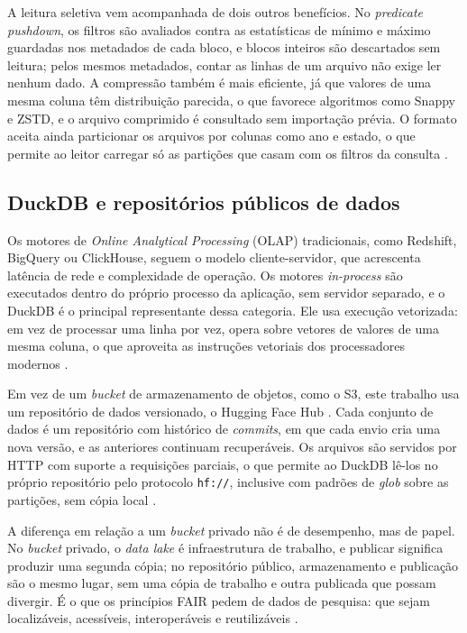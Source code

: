 A leitura seletiva vem acompanhada de dois outros benefícios. No \textit{predicate pushdown}, os filtros são avaliados contra as estatísticas de mínimo e máximo guardadas nos metadados de cada bloco, e blocos inteiros são descartados sem leitura; pelos mesmos metadados, contar as linhas de um arquivo não exige ler nenhum dado. A compressão também é mais eficiente, já que valores de uma mesma coluna têm distribuição parecida, o que favorece algoritmos como Snappy e ZSTD, e o arquivo comprimido é consultado sem importação prévia. O formato aceita ainda particionar os arquivos por colunas como ano e estado, o que permite ao leitor carregar só as partições que casam com os filtros da consulta \cite{ApacheParquet2024}.

\subsection{DuckDB e repositórios públicos de dados}
\label{subsec:motores-in-process}

Os motores de \textit{Online Analytical Processing} (OLAP) tradicionais, como Redshift, BigQuery ou ClickHouse, seguem o modelo cliente-servidor, que acrescenta latência de rede e complexidade de operação. Os motores \textit{in-process} são executados dentro do próprio processo da aplicação, sem servidor separado, e o DuckDB é o principal representante dessa categoria. Ele usa execução vetorizada: em vez de processar uma linha por vez, opera sobre vetores de valores de uma mesma coluna, o que aproveita as instruções vetoriais dos processadores modernos \cite{Raasveldt2019}.

\label{subsec:repositorios-dados}

Em vez de um \textit{bucket} de armazenamento de objetos, como o S3, este trabalho usa um repositório de dados versionado, o Hugging Face Hub \cite{HuggingFaceDatasets2026}. Cada conjunto de dados é um repositório com histórico de \textit{commits}, em que cada envio cria uma nova versão, e as anteriores continuam recuperáveis. Os arquivos são servidos por HTTP com suporte a requisições parciais, o que permite ao DuckDB lê-los no próprio repositório pelo protocolo \texttt{hf://}, inclusive com padrões de \textit{glob} sobre as partições, sem cópia local \cite{DuckDB2024}.

A diferença em relação a um \textit{bucket} privado não é de desempenho, mas de papel. No \textit{bucket} privado, o \textit{data lake} é infraestrutura de trabalho, e publicar significa produzir uma segunda cópia; no repositório público, armazenamento e publicação são o mesmo lugar, sem uma cópia de trabalho e outra publicada que possam divergir. É o que os princípios FAIR pedem de dados de pesquisa: que sejam localizáveis, acessíveis, interoperáveis e reutilizáveis \cite{WilkinsonFair2016}.

